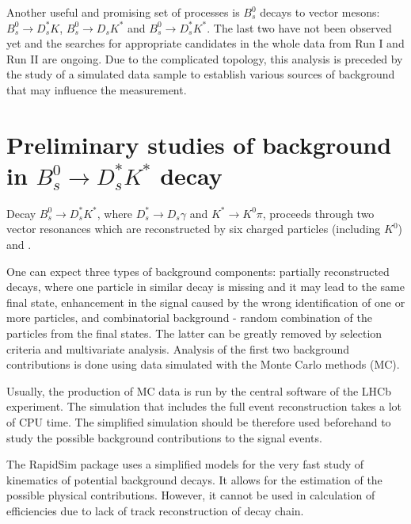 \documentclass{appolb}
\begin{document}
Another useful and promising set of processes is $B^0_s$ decays to vector mesons: $B^0_s \rightarrow D_s^* K$,  $B^0_s \rightarrow D_s K^*$ and $B^0_s \rightarrow D_s^* K^*$. The last two have not been observed yet and the searches for appropriate candidates in the whole data from Run I and Run II are ongoing. Due to the complicated topology, this analysis is preceded by the study of a simulated data sample to establish various sources of background that may influence the measurement.


\section{Preliminary studies of background in $B^0_s \rightarrow D_s^* K^*$ decay}

Decay $B^0_s \rightarrow D_s^* K^*$, where $D^*_s\rightarrow D_s \gamma$ and $K^*\rightarrow K^0 \pi$, proceeds through two vector resonances which are reconstructed by six charged particles (including $K^0$) and \g. 

 One can expect three types of background components: partially reconstructed decays, where one particle in similar decay is missing and it may lead to the same final state, enhancement in the signal caused by the wrong identification of one or more particles, and combinatorial background - random combination of the particles from the final states. 
 The latter can be greatly removed by selection criteria and multivariate analysis. Analysis of the first two background contributions is done using data simulated with the Monte Carlo methods (MC).

Usually, the production of MC data is run by the central software of the LHCb experiment. The simulation that includes the full event reconstruction takes a lot of CPU time. The simplified simulation should be therefore used beforehand to study the possible background contributions to the signal events.

The RapidSim package \cite{rapidsim} uses a simplified models for the very fast study of kinematics of potential background decays. It allows for the estimation of the possible physical contributions. However, it cannot be used in calculation of efficiencies due to lack of track reconstruction of decay chain. 
\end{document}
